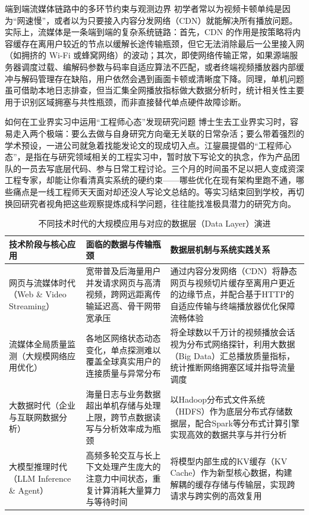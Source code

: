 \documentclass[UTF8,a4paper,11pt,fontset=fandol]{ctexart}
\begin{document}
\begin{warningbox}{端到端流媒体链路中的多环节约束与观测边界}
初学者常以为视频卡顿单纯是因为“网速慢”，或者以为只要接入内容分发网络（CDN）就能解决所有播放问题。实际上，流媒体是一条端到端的复杂系统链路：首先，CDN 的作用是按策略将内容缓存在离用户较近的节点以缓解长途传输瓶颈，但它无法消除最后一公里接入网（如拥挤的 Wi-Fi 或蜂窝网络）的波动；其次，即使网络传输正常，如果源端服务器调度过载、编解码参数与码率自适应算法不匹配，或者终端视频播放器内部缓冲与解码管理存在缺陷，用户依然会遇到画面卡顿或清晰度下降。同理，单机问题虽可借助本地日志排查，但当汇集全网播放指标做大数据分析时，统计相关性主要用于识别区域拥塞与共性瓶颈，而非直接替代单点硬件故障诊断。
\end{warningbox}
\begin{importantbox}{如何在工业界实习中运用“工程师心态”发现研究问题}
博士生去工业界实习时，容易走入两个极端：要么去做与自身研究方向毫无关联的日常杂活；要么带着强烈的学术预设，一进公司就急着找能发论文的现成切入点。江鋆晨提倡的“工程师心态”，是指在与研究领域相关的工程实习中，暂时放下写论文的执念，作为产品团队的一员去写底层代码、参与日常工程讨论。三个月的时间虽不足以把人变成资深工程专家，却能让你看清真实系统的硬约束——哪些优化在现有架构里跑不通，哪些痛点是一线工程师天天面对却还没人写论文总结的。等实习结束回到学校，再切换回研究者视角把这些观察提炼成科学问题，往往能找准极具潜力的研究方向。
\end{importantbox}
\begin{table}[H]\centering\small
\caption{不同技术时代的大规模应用与对应的数据层（Data Layer）演进}
\begin{tabular}{>{\raggedright\arraybackslash}p{\dimexpr(\linewidth-6\tabcolsep)/3\relax}>{\raggedright\arraybackslash}p{\dimexpr(\linewidth-6\tabcolsep)/3\relax}>{\raggedright\arraybackslash}p{\dimexpr(\linewidth-6\tabcolsep)/3\relax}}
\toprule
技术阶段与核心应用 & 面临的数据与传输瓶颈 & 数据层机制与系统实践关系\\\midrule
网页与流媒体时代（Web \& Video Streaming） & 宽带普及后海量用户并发请求网页与高清视频，跨网远距离传输延迟高、骨干网带宽承压 & 通过内容分发网络（CDN）将静态网页与视频切片缓存至离用户更近的边缘节点，并配合基于HTTP的自适应传输与终端播放器优化保障流畅体验\\[4pt]
流媒体全局质量监测（大规模网络应用优化） & 各地区网络状态动态变化，单点探测难以覆盖全球真实用户的连接质量与异常分布 & 将全球数以千万计的视频播放会话视为分布式网络探针，利用大数据（Big Data）汇总播放质量指标，统计推断网络拥塞区域并指导流量调度\\[4pt]
大数据时代（企业与互联网数据分析） & 海量日志与业务数据超出单机存储与处理上限，跨节点数据读写与分析效率成为瓶颈 & 以Hadoop分布式文件系统（HDFS）作为底层分布式存储数据层，配合Spark等分布式计算引擎实现高效的数据共享与并行分析\\[4pt]
大模型推理时代（LLM Inference \& Agent） & 高频多轮交互与长上下文处理产生庞大的注意力中间状态，重复计算消耗大量算力与等待时间 & 将模型内部生成的KV缓存（KV Cache）作为新型核心数据，构建解耦的缓存存储与传输层，实现跨请求与跨实例的高效复用\\[4pt]
\bottomrule\end{tabular}\end{table}
\end{document}
